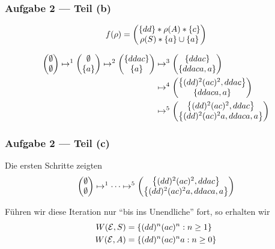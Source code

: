 \documentclass{beamer}
\begin{document}
\begin{frame} \frametitle{Aufgabe 2 --- Teil (b)}
	\begin{equation*}
		f(\rho) = \begin{pmatrix}
			\left\{ dd \right\} * \rho(A) * \left\{ c \right\} \\ \rho(S) * \left\{ a \right\} \cup \left\{ a \right\}
		\end{pmatrix}
	\end{equation*}
	
	\begin{align*}
		\begin{pmatrix} \emptyset \\ \emptyset \end{pmatrix}
		\mapsto^1
		\begin{pmatrix} \emptyset \\ \left\{ a \right\} \end{pmatrix}
		\mapsto^2
		\begin{pmatrix} \left\{ ddac \right\} \\ \left\{ a \right\} \end{pmatrix}
		&\mapsto^3
		\begin{pmatrix} \left\{ ddac \right\} \\ \left\{ ddaca,a \right\} \end{pmatrix} \\
		&\mapsto^4
		\begin{pmatrix} \left\{ (dd)^2 (ac)^2, ddac \right\} \\ \left\{ ddaca, a \right\} \end{pmatrix} \\
		&\mapsto^5
		\begin{pmatrix} \left\{ (dd)^2 (ac)^2, ddac \right\} \\ \left\{ (dd)^2 (ac)^2 a, ddaca, a \right\} \end{pmatrix}
	\end{align*}
\end{frame}

\begin{frame} \frametitle{Aufgabe 2 --- Teil (c)}
	Die ersten Schritte zeigten 
	\begin{equation*}
		\begin{pmatrix} \emptyset \\ \emptyset \end{pmatrix}
		\mapsto^1 \cdots \mapsto^5
		\begin{pmatrix} \left\{ (dd)^2 (ac)^2, ddac \right\} \\ \left\{ (dd)^2 (ac)^2 a, ddaca, a \right\} \end{pmatrix}
	\end{equation*}
	
	Führen wir diese Iteration nur \enquote{bis ins Unendliche} fort, so erhalten wir
	\begin{align*}
		W(\mathcal{E}, S) &= \left\{ (dd)^n (ac)^n : n \ge 1 \right\} \\
		W(\mathcal{E}, A) &= \left\{ (dd)^n (ac)^n a : n \ge 0 \right\}
	\end{align*}
\end{frame}
\end{document}
